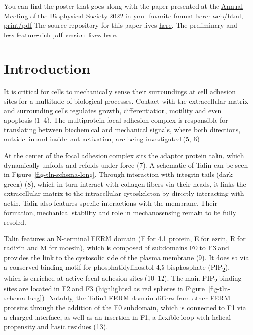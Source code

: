 \documentclass[
  letterpaper,
  DIV=11,
  numbers=noendperiod]{scrartcl}
\begin{document}
\begin{tcolorbox}[standard jigsaw,coltitle=black, titlerule=0mm, left=2mm, title=\textcolor{quarto-callout-tip-color}{\faLightbulb}\hspace{0.5em}Tip, arc=.35mm, bottomtitle=1mm, colframe=quarto-callout-tip-color-frame, toptitle=1mm, bottomrule=.15mm, toprule=.15mm, colback=white, opacityback=0, rightrule=.15mm, leftrule=.75mm, opacitybacktitle=0.6, colbacktitle=quarto-callout-tip-color!10!white]
You can find the poster that goes along with the paper presented at the
\href{https://www.biophysics.org/2022meeting\#}{Annual Meeting of the
Biophysical Society 2022} in your favorite format here:
\href{./poster.html}{web/html}, \href{./poster.pdf}{print/pdf} The
source repository for this paper lives
\href{https://github.com/hits-mbm-dev/paper-talin-loop}{here}. The
preliminary and less feature-rich pdf version lives
\href{./index.pdf}{here}.
\end{tcolorbox}

\hypertarget{introduction}{%
\section{Introduction}\label{introduction}}

It is critical for cells to mechanically sense their surroundings at
cell adhesion sites for a multitude of biological processes. Contact
with the extracellular matrix and surrounding cells regulates growth,
differentiation, motility and even apoptosis (1--4). The multiprotein
focal adhesion complex is responsible for translating between
biochemical and mechanical signals, where both directions, outside--in
and inside--out activation, are being investigated (5, 6).

At the center of the focal adhesion complex sits the adaptor protein
talin, which dynamically unfolds and refolds under force (7). A
schematic of Talin can be seen in Figure~\ref{fig-tln-schema-long}.
Through interaction with integrin tails (dark green) (8), which in turn
interact with collagen fibers via their heads, it links the
extracellular matrix to the intracellular cytoskeleton by directly
interacting with actin. Talin also features specfic interactions with
the membrane. Their formation, mechanical stability and role in
mechanosensing remain to be fully resoled.

Talin features an N-terminal FERM domain (F for 4.1 protein, E for
ezrin, R for radixin and M for moesin), which is composed of subdomains
F0 to F3 and provides the link to the cystosolic side of the plasma
membrane (9). It does so via a conserved binding motif for
phosphatidylinositol 4,5-bisphosphate (PIP\textsubscript{2}), which is
enriched at active focal adhesion sites (10--12). The main
PIP\textsubscript{2} binding sites are located in F2 and F3 (highlighted
as red spheres in Figure~\ref{fig-tln-schema-long}). Notably, the Talin1
FERM domain differs from other FERM proteins through the addition of the
F0 subdomain, which is connected to F1 via a charged interface, as well
as an insertion in F1, a flexible loop with helical propensity and basic
residues (13).
\end{document}
